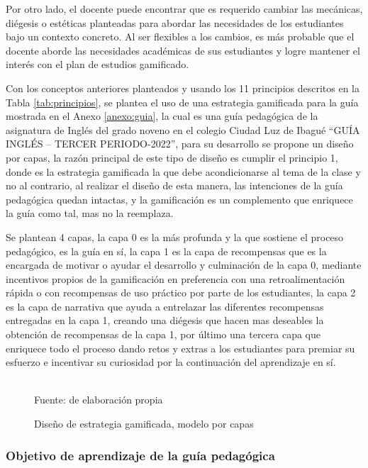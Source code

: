 Por otro lado, el docente puede encontrar que es requerido cambiar las mecánicas, diégesis o estéticas 
planteadas para abordar las necesidades de los estudiantes bajo un contexto concreto. Al ser flexibles a los 
cambios, es más probable que el docente aborde las necesidades académicas de sus estudiantes y logre mantener 
el interés con el plan de estudios gamificado.

Con los conceptos anteriores planteados y usando los 11 principios descritos en la Tabla \ref{tab:principios}, 
se plantea el uso de una estrategia gamificada para la guía mostrada en el Anexo \ref{anexo:guia}, la cual es 
una guía pedagógica de la asignatura de Inglés del grado noveno en el colegio Ciudad Luz de Ibagué ``GUÍA 
INGLÉS – TERCER PERIODO-2022'', para su desarrollo se propone un diseño por capas, la razón principal de este 
tipo de diseño es cumplir el principio 1, donde es la estrategia gamificada la que debe acondicionarse al tema 
de la clase y no al contrario, al realizar el diseño de esta manera, las intenciones de la guía pedagógica 
quedan intactas, y la gamificación es un complemento que enriquece la guía como tal, mas no la reemplaza.

Se plantean 4 capas, la capa 0 es la más profunda y la que sostiene el proceso pedagógico, es la guía en sí, 
la capa 1 es la capa de recompensas que es la encargada de motivar o ayudar el desarrollo y culminación de la 
capa 0, mediante incentivos propios de la gamificación en preferencia con una retroalimentación rápida o con 
recompensas de uso práctico por parte de los estudiantes, la capa 2 es la capa de narrativa que ayuda a 
entrelazar las diferentes recompensas entregadas en la capa 1, creando una diégesis que hacen mas deseables la 
obtención de recompensas de la capa 1, por último una tercera capa que enriquece todo el proceso dando retos y 
extras a los estudiantes para premiar su esfuerzo e incentivar su curiosidad por la continuación del 
aprendizaje en sí.

\begin{figure}[ht]
\caption{Diseño de estrategia gamificada, modelo por capas}
\label{img:tflow}
\centering

\\
{\footnotesize Fuente: de elaboración propia}
\end{figure}

\subsubsection{Objetivo de aprendizaje de la guía pedagógica}


